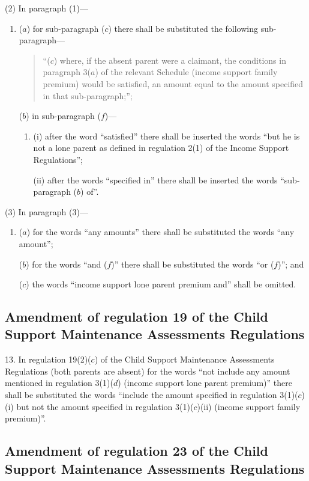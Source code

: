 \documentclass[12pt,a4paper]{article}
\begin{document}
(2) In paragraph (1)—
\begin{enumerate}\item[]
($a$) for sub-paragraph ($c$) there shall be substituted the following sub-paragraph—
\begin{quotation}
“($c$) where, if the absent parent were a claimant, the conditions in paragraph 3($a$) of the relevant Schedule (income support family premium) would be satisfied, an amount equal to the amount specified in that sub-paragraph;”;
\end{quotation}

($b$) in sub-paragraph ($f$)—
\begin{enumerate}\item[]
(i) after the word “satisfied” there shall be inserted the words “but he is not a lone parent as defined in regulation 2(1) of the Income Support Regulations”;

(ii) after the words “specified in” there shall be inserted the words “sub-paragraph ($b$) of”.
\end{enumerate}
\end{enumerate}

(3) In paragraph (3)—
\begin{enumerate}\item[]
($a$) for the words “any amounts” there shall be substituted the words “any amount”;

($b$) for the words “and ($f$)” there shall be substituted the words “or ($f$)”; and

($c$) the words “income support lone parent premium and” shall be omitted.
\end{enumerate}

\subsection[13. Amendment of regulation 19 of the Child Support Maintenance Assessments Regulations]{\sloppy Amendment of regulation 19 of the Child Support Maintenance Assessments Regulations}

13.  In regulation 19(2)($c$) of the Child Support Maintenance Assessments Regulations (both parents are absent) for the words “not include any amount mentioned in regulation 3(1)($d$) (income support lone parent premium)” there shall be substituted the words “include the amount specified in regulation 3(1)($c$)(i) but not the amount specified in regulation 3(1)($c$)(ii) (income support family premium)”.

\subsection[14. Amendment of regulation 23 of the Child Support Maintenance Assessments Regulations]{\sloppy Amendment of regulation 23 of the Child Support Maintenance Assessments Regulations}
\end{document}
